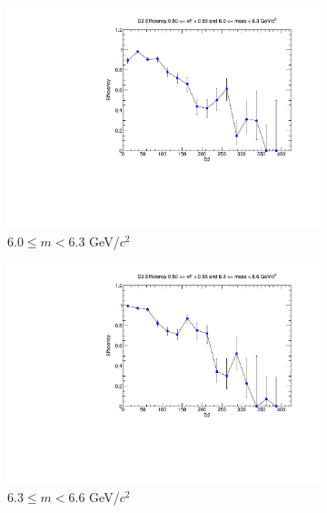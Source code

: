 \documentclass[11pt]{article}
\begin{document}
\begin{figure}[p]
\begin{subfigure}[b]{0.32\textwidth}
        \includegraphics[width=\textwidth]{./kTrackerEfficiencyPlots/D2_Efficiency_xF10_mass6.pdf}
        \caption{$6.0 \leq m < 6.3$ GeV/$c^2$}
    \end{subfigure}\hfill
    \begin{subfigure}[b]{0.32\textwidth}
        \centering
        \includegraphics[width=\textwidth]{./kTrackerEfficiencyPlots/D2_Efficiency_xF10_mass7.pdf}
        \caption{$6.3 \leq m < 6.6$ GeV/$c^2$}
    \end{subfigure}\hfill
    \begin{subfigure}[b]{0.32\textwidth}
        \centering

\end{subfigure}
\end{figure}
\end{document}
